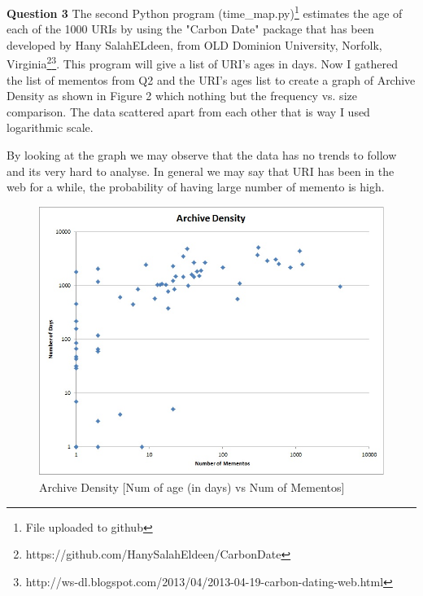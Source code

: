 \documentclass[a4paper,12pt]{article}
\begin{document}
\pagebreak
\textbf{Question 3}
The second Python program (time\_map.py)\footnote{File uploaded to github} estimates the age of each of the 1000 URIs by using the "Carbon Date" package that has been  developed by Hany SalahELdeen, from OLD Dominion University, Norfolk, Virginia\footnote{https://github.com/HanySalahEldeen/CarbonDate}\footnote{http://ws-dl.blogspot.com/2013/04/2013-04-19-carbon-dating-web.html}. This program will give a list of URI's ages in days. Now I gathered the list of mementos from Q2 and the URI's ages list to create a graph of Archive Density as shown in Figure 2 which nothing but the frequency vs. size comparison. The data scattered apart from each other that is way I used logarithmic scale.\par
By looking at the graph we may observe that the data has no trends to follow and its very hard to analyse. In general we may say that URI has been in the web for a while, the probability of having large number of memento is high.   
\linebreak
  
\pagebreak
\begin{figure}
\center
\includegraphics[width=\linewidth]{fig2.jpg} 
\caption{Archive Density [Num of age (in days) vs Num of Mementos]}
\end{figure}
\end{document}
